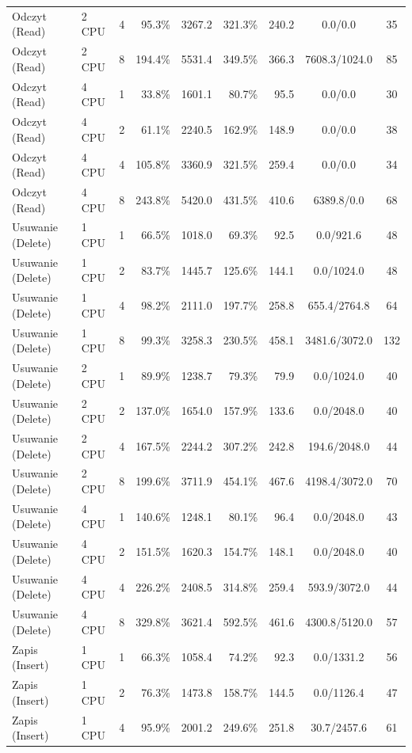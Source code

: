 \begin{table}[ht]
{\begin{tabular}{llcrrrrcc}
Odczyt (Read) & 2 CPU & 4 & 95.3\% & 3267.2 & 321.3\% & 240.2 & 0.0/0.0 & 35 \\
Odczyt (Read) & 2 CPU & 8 & 194.4\% & 5531.4 & 349.5\% & 366.3 & 7608.3/1024.0 & 85 \\
Odczyt (Read) & 4 CPU & 1 & 33.8\% & 1601.1 & 80.7\% & 95.5 & 0.0/0.0 & 30 \\
Odczyt (Read) & 4 CPU & 2 & 61.1\% & 2240.5 & 162.9\% & 148.9 & 0.0/0.0 & 38 \\
Odczyt (Read) & 4 CPU & 4 & 105.8\% & 3360.9 & 321.5\% & 259.4 & 0.0/0.0 & 34 \\
Odczyt (Read) & 4 CPU & 8 & 243.8\% & 5420.0 & 431.5\% & 410.6 & 6389.8/0.0 & 68 \\
Usuwanie (Delete) & 1 CPU & 1 & 66.5\% & 1018.0 & 69.3\% & 92.5 & 0.0/921.6 & 48 \\
Usuwanie (Delete) & 1 CPU & 2 & 83.7\% & 1445.7 & 125.6\% & 144.1 & 0.0/1024.0 & 48 \\
Usuwanie (Delete) & 1 CPU & 4 & 98.2\% & 2111.0 & 197.7\% & 258.8 & 655.4/2764.8 & 64 \\
Usuwanie (Delete) & 1 CPU & 8 & 99.3\% & 3258.3 & 230.5\% & 458.1 & 3481.6/3072.0 & 132 \\
Usuwanie (Delete) & 2 CPU & 1 & 89.9\% & 1238.7 & 79.3\% & 79.9 & 0.0/1024.0 & 40 \\
Usuwanie (Delete) & 2 CPU & 2 & 137.0\% & 1654.0 & 157.9\% & 133.6 & 0.0/2048.0 & 40 \\
Usuwanie (Delete) & 2 CPU & 4 & 167.5\% & 2244.2 & 307.2\% & 242.8 & 194.6/2048.0 & 44 \\
Usuwanie (Delete) & 2 CPU & 8 & 199.6\% & 3711.9 & 454.1\% & 467.6 & 4198.4/3072.0 & 70 \\
Usuwanie (Delete) & 4 CPU & 1 & 140.6\% & 1248.1 & 80.1\% & 96.4 & 0.0/2048.0 & 43 \\
Usuwanie (Delete) & 4 CPU & 2 & 151.5\% & 1620.3 & 154.7\% & 148.1 & 0.0/2048.0 & 40 \\
Usuwanie (Delete) & 4 CPU & 4 & 226.2\% & 2408.5 & 314.8\% & 259.4 & 593.9/3072.0 & 44 \\
Usuwanie (Delete) & 4 CPU & 8 & 329.8\% & 3621.4 & 592.5\% & 461.6 & 4300.8/5120.0 & 57 \\
Zapis (Insert) & 1 CPU & 1 & 66.3\% & 1058.4 & 74.2\% & 92.3 & 0.0/1331.2 & 56 \\
Zapis (Insert) & 1 CPU & 2 & 76.3\% & 1473.8 & 158.7\% & 144.5 & 0.0/1126.4 & 47 \\
Zapis (Insert) & 1 CPU & 4 & 95.9\% & 2001.2 & 249.6\% & 251.8 & 30.7/2457.6 & 61 \\

\end{tabular}}
\end{table}
